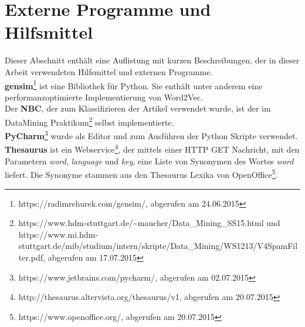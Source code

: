 \documentclass[12pt,a4paper]{report}
\begin{document}
	\section{Externe Programme und Hilfsmittel}
	Dieser Abschnitt enthält eine Auflistung mit kurzen Beschreibungen, der in dieser Arbeit verwendeten Hilfsmittel und externen Programme.\\
	\textbf{gensim}\cite{rehurek_lrec}\footnote{https://radimrehurek.com/gensim/, abgerufen am 24.06.2015} ist eine Bibliothek für Python. Sie enthält unter anderem eine performanzoptimierte Implementierung von Word2Vec.\\ 
	Der \textbf{NBC}, der zum Klassifizieren der Artikel verwendet wurde, ist der im DataMining Praktikum\footnote{https://www.hdm-stuttgart.de/\textasciitilde maucher/Data\_Mining\_SS15.html und https://www.mi.hdm-stuttgart.de/mib/studium/intern/skripte/Data\_Mining/WS1213/V4SpamFilter.pdf, abgerufen am 17.07.2015} selbst implementierte.\\
	\textbf{PyCharm}\footnote{https://www.jetbrains.com/pycharm/, abgerufen am 02.07.2015} wurde als Editor und zum Ausführen der Python Skripte verwendet.
	\textbf{Thesaurus} ist ein Webservice\footnote{http://thesaurus.altervista.org/thesaurus/v1, abgerufen am 20.07.2015}, der mittels einer HTTP GET Nachricht, mit den Parametern \textit{word}, \textit{language} und \textit{key}, eine Liste von Synonymen des Wortes \textit{word} liefert. Die Synonyme stammen aus den Thesaurus Lexika von OpenOffice\footnote{https://www.openoffice.org/, abgerufen am 20.07.2015}.

	
\end{document}
